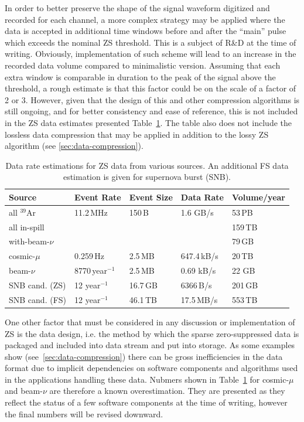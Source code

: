 In order to better preserve the shape of the signal waveform digitized and recorded for
each channel, a more complex strategy may be applied where the data is accepted in additional
time windows before and after the ``main'' pulse which exceeds the nominal ZS threshold. This
is a subject of R\&D at the time of writing. Obviously, implementation of such scheme will lead
to an increase in the recorded data volume compared to minimalistic version. Assuming that
each extra window is comparable in duration to the peak of the signal above the threshold,
a rough estimate is that this factor could be on the scale of a factor of 2 or 3. However, given
that the design of this and other compression algorithms is still ongoing, and for better consistency
and ease of reference, this is not included in the ZS data estimates presented Table~\ref{tab:zs-volume}.
The table also does not include the lossless data compression that may be applied
in addition to the lossy ZS algorithm (see \ref{sec:data-compression}).
	
\begin{table}[ht!]
\centering
\begin{tabular}{| p{1.2in} | p{0.9in} | p{0.75in} | p{1in} | p{0.9in} |}		\hline		
Source & Event Rate & Event Size & Data Rate & Volume/year \\ \hline
all $^{39}$Ar & 11.2\,MHz & 150\,B & 1.6 GB/s &  53\,PB \\ \hline
all in-spill & & & & 159\,TB \\ \hline
with-beam-$\nu$ & & & & 79\,GB \\ \hline
cosmic-$\mu$ & 0.259\,Hz &2.5\,MB & 647.4\,kB/s & 20\,TB \\	\hline
beam-$\nu$ & 8770\,year$^{-1}$ & 2.5\,MB & 0.69 kB/s & 22 GB \\ \hline
SNB cand. (ZS) & 12 year$^{-1}$ & 16.7\,GB & 6366\,B/s & 201\,GB \\ \hline
SNB cand. (FS) & 12 year$^{-1}$ & 46.1\,TB & 17.5\,MB/s & 553\,TB \\ \hline
\end{tabular}
\caption{Data rate estimations for ZS data from various sources.
An additional FS data estimation is given for supernova burst (SNB).}
\label{tab:zs-volume}
\end{table}
\noindent
One other factor that must be considered in any discussion or implementation of ZS is the data design,
i.e. the method by which the sparse zero-suppressed data is packaged and included into
data stream and put into storage. As some examples show (see~\ref{sec:data-compression})
there can be gross inefficiencies in the data format due to implicit dependencies
on software components and algorithms used in the applications handling these data.
Nubmers shown in Table~\ref{tab:zs-volume} for cosmic-$\mu$ and beam-$\nu$
are therefore a known overestimation. They are presented as they reflect the status
of a few software components at the time of writing, however the final numbers
will be revised downward.


